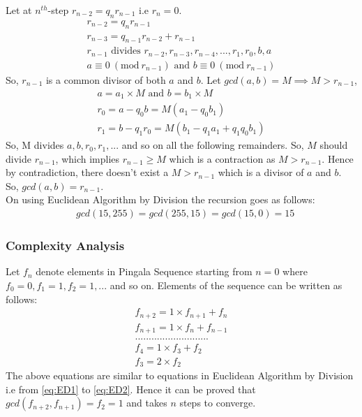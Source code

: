 \documentclass[journal,12pt,twocolumn]{IEEEtran}
\begin{document}
Let at $n^{th}$-step $r_{n-2} = q_{n}r_{n-1}$ i.e $r_{n} = 0$.
 \begin{align}
    r_{n-2} = q_{n}r_{n-1}\label{eq:ED2}\\
    r_{n-3} = q_{n-1}r_{n-2} + r_{n-1}\\
    r_{n-1} \text{ divides } r_{n-2}, r_{n-3}, r_{n-4},..., r_{1}, r_{0}, b, a\\
    a \equiv 0\ (\textrm{mod}\ r_{n-1}) \text{ and } b \equiv 0\ (\textrm{mod}\ r_{n-1})
\end{align}
So, $r_{n-1}$ is a common divisor of both $a$ and $b$. Let $gcd(a,b) = M \implies M > r_{n-1}$,\\
\begin{align}
    a = a_{1} \times M \text{ and } b = b_{1} \times M\\
    r_{0} = a - q_{0}b = M(a_{1} - q_{0}b_{1})\\
    r_{1} = b - q_{1}r_{0} = M(b_{1} - q_{1}a_{1} + q_{1}q_{0}b_{1})
\end{align}
So, M divides $a, b, r_{0}, r_{1}, ... $ and so on all the following remainders. So, $M$ should divide $r_{n-1}$, which implies $r_{n-1} \geq M$ which is a contraction as $M > r_{n-1}$. Hence by contradiction, there doesn't exist a $M > r_{n-1}$ which is a divisor of $a$ and $b$. So, $gcd(a,b) = r_{n-1}$.\\

\quad On using Euclidean Algorithm by Division the recursion goes as follows:
\[
\begin{split}
&gcd(15,255) = gcd(255,15) = gcd(15,0) = 15
\end{split}\]

\subsubsection{Complexity Analysis}
Let $f_{n}$ denote elements in Pingala Sequence starting from $n=0$ where $f_{0} = 0, f_{1} = 1, f_{2} = 1,...$ and so on. Elements of the sequence can be written as follows:
\begin{align*}
f_{n+2} = 1 \times f_{n+1} + f_{n}\\
f_{n+1} = 1 \times f_{n} + f_{n-1}\\
...........................\\
f_{4} = 1 \times f_{3} + f_{2}\\
f_{3} = 2 \times f_{2}
\end{align*}
The above equations are similar to equations in Euclidean Algorithm by Division i.e from \eqref{eq:ED1} to \eqref{eq:ED2}. Hence it can be proved that $gcd(f_{n+2}, f_{n+1}) = f_{2} = 1$ and takes $n$ steps to converge.\\
\end{document}
